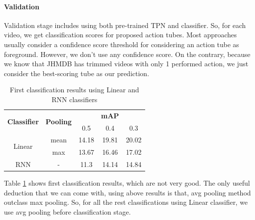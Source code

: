 \documentclass{report}
\begin{document}
\paragraph{Validation} Validation stage includes using both pre-trained TPN and classifier. So, for each video,
we get classification scores for proposed action tubes. Most approaches usually consider a confidence score threshold for
considering an action tube as foreground. However, we don't use any confidence score. On the contrary, because we
know that JHMDB has trimmed videos with only 1 performed action, we just consider the best-scoring tube as our prediction.


\begin{table}[h]
  \centering
  \begin{tabular}{|| c | c || c  c  c ||}
    \hline
    \multirow{2}{*}{\textbf{Classifier}} & \multirow{2}{*}{\textbf{Pooling}} &  {} & \textbf{mAP} & {} \\
    {} & {} & 0.5 & 0.4 & 0.3 \\
    \hline
    \multirow{2}{*}{Linear} & mean & 14.18 & 19.81 & 20.02 \\
    \cline{2-5}
    {} & max & 13.67 & 16.46 & 17.02 \\
    \hline
    RNN  & -  & 11.3 & 14.14 & 14.84 \\
    \hline
  \end{tabular}
  \caption{First classification results using Linear and RNN classifiers}
  \label{table:rnn_linear}
\end{table}

  
Table \ref{table:rnn_linear} shows first classification results, which are not very good. The only useful deduction that we can come with, using above results is that, avg pooling
method outclass max pooling. So, for all the rest classifications using Linear classifier, we use avg pooling before classification
stage.
\end{document}

